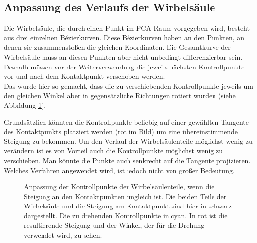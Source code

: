 \subsection{Anpassung des Verlaufs der Wirbelsäule}
\label{section:smooth_spine}

Die Wirbelsäule, die durch einen Punkt im PCA-Raum vorgegeben wird, besteht aus drei einzelnen Bézierkurven. Diese Bézierkurven haben an den Punkten, an denen sie zusammenstoßen die gleichen Koordinaten. Die Gesamtkurve der Wirbelsäule muss an diesen Punkten aber nicht unbedingt differenzierbar sein.
Deshalb müssen vor der Weiterverwendung die jeweils nächsten Kontrollpunkte vor und nach dem Kontaktpunkt verschoben werden. \\
Das wurde hier so gemacht, dass die zu verschiebenden Kontrollpunkte jeweils um den gleichen Winkel aber in gegensätzliche Richtungen rotiert wurden (siehe Abbildung \ref{smooth_spine}). 

Grundsätzlich könnten die Kontrollpunkte beliebig auf einer gewählten Tangente des Kontaktpunkts platziert werden (rot im Bild) um eine übereinstimmende Steigung zu bekommen. Um den Verlauf der Wirbelsäulenteile möglichst wenig zu verändern ist es von Vorteil auch die Kontrollpunkte möglichst wenig zu verschieben. Man könnte die Punkte \zb auch senkrecht auf die Tangente projizieren. Welches Verfahren angewendet wird, ist jedoch nicht von großer Bedeutung. 

\begin{figure}
 \qquad
 \caption{Anpassung der Kontrollpunkte der Wirbelsäulenteile, wenn die Steigung an den Kontaktpunkten ungleich ist. Die beiden Teile der Wirbelsäule und die Steigung am Kontaktpunkt sind hier in schwarz dargestellt. Die zu drehenden Kontrollpunkte in cyan. In rot ist die resultierende Steigung und der Winkel, der für die Drehung verwendet wird, zu sehen.}
 \label{smooth_spine}
\end{figure}


